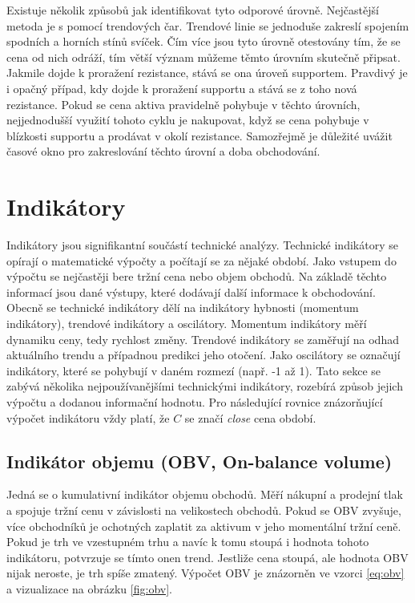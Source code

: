 Existuje několik způsobů jak identifikovat tyto odporové úrovně. Nejčastější metoda je s pomocí trendových čar. Trendové linie se jednoduše zakreslí spojením spodních a horních stínů svíček.
Čím více jsou tyto úrovně otestovány tím, že se cena od nich odráží, tím větší význam můžeme těmto úrovním skutečně připsat. Jakmile dojde k proražení rezistance, stává se ona úroveň
supportem. Pravdivý je i opačný případ, kdy dojde k proražení supportu a stává se z toho nová rezistance.
Pokud se cena aktiva pravidelně pohybuje v těchto úrovních, nejjednodušší využití tohoto cyklu je nakupovat, když se cena pohybuje v blízkosti supportu a prodávat v okolí rezistance.
Samozřejmě je důležité uvážit časové okno pro zakreslování těchto úrovní a doba obchodování.

\section{Indikátory}
\label{sec:Indicators}
Indikátory jsou signifikantní součástí technické analýzy. Technické indikátory se opírají o matematické výpočty a počítají se za nějaké období. Jako vstupem do výpočtu se nejčastěji
bere tržní cena nebo objem obchodů. Na základě těchto informací jsou dané výstupy, které dodávají další informace k obchodování.
Obecně se technické indikátory dělí na indikátory hybnosti (momentum indikátory), trendové indikátory a oscilátory. Momentum indikátory měří dynamiku ceny, tedy rychlost změny.
Trendové indikátory se zaměřují na odhad aktuálního trendu a případnou predikci jeho otočení. Jako oscilátory se označují indikátory, které se pohybují v daném rozmezí (např. -1 až 1).
Tato sekce se zabývá několika nejpoužívanějšími technickými indikátory, rozebírá způsob jejich výpočtu a dodanou informační hodnotu. Pro následující rovnice znázorňující výpočet indikátoru
vždy platí, že $C$ se značí \emph{close} cena období.

\subsection{Indikátor objemu (OBV, On-balance volume)}
Jedná se o kumulativní indikátor objemu obchodů. Měří nákupní a prodejní tlak a spojuje tržní cenu v závislosti na velikostech obchodů. Pokud se OBV zvyšuje, více obchodníků
je ochotných zaplatit za aktivum v jeho momentální tržní ceně. Pokud je trh ve vzestupném trhu a navíc k tomu stoupá i hodnota tohoto indikátoru, potvrzuje se tímto onen trend.
Jestliže cena stoupá, ale hodnota OBV nijak neroste, je trh spíše zmatený. Výpočet OBV je znázorněn ve vzorci \ref{eq:obv} a vizualizace na obrázku \ref{fig:obv}.

